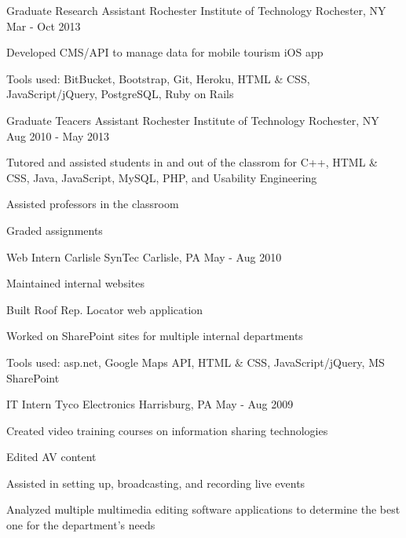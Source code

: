 \begin{cventries}
  \cventry
    {Graduate Research Assistant} %
    {Rochester Institute of Technology} %
    {Rochester, NY} %
    {Mar - Oct 2013} %
    {
      \begin{cvitems} %
        \item {Developed CMS/API to manage data for mobile tourism iOS app}
        \item {Tools used: BitBucket, Bootstrap, Git, Heroku, HTML \& CSS, JavaScript/jQuery, PostgreSQL, Ruby on Rails}
      \end{cvitems}
    }

  \cventry
    {Graduate Teacers Assistant}
    {Rochester Institute of Technology}
    {Rochester, NY}
    {Aug 2010 - May 2013}
    {
      \begin{cvitems}
        \item {Tutored and assisted students in and out of the classrom for C++, HTML \& CSS, Java, JavaScript, MySQL, PHP, and Usability Engineering}
        \item {Assisted professors in the classroom}
        \item {Graded assignments}
     \end{cvitems}
   }

  \cventry
    {Web Intern}
    {Carlisle SynTec}
    {Carlisle, PA}
    {May - Aug 2010}
    {
      \begin{cvitems}
        \item {Maintained internal websites}
        \item {Built Roof Rep. Locator web application}
        \item {Worked on SharePoint sites for multiple internal departments}
        \item {Tools used: asp.net, Google Maps API, HTML \& CSS, JavaScript/jQuery, MS SharePoint}
      \end{cvitems}
    }

  \cventry
    {IT Intern}
    {Tyco Electronics}
    {Harrisburg, PA}
    {May - Aug 2009}
    {
      \begin{cvitems}
        \item {Created video training courses on information sharing technologies}
        \item {Edited AV content}
        \item {Assisted in setting up, broadcasting, and recording live events}
        \item {Analyzed multiple multimedia editing software applications to determine the best one for the department's needs}
      \end{cvitems}
    }


\end{cventries}
